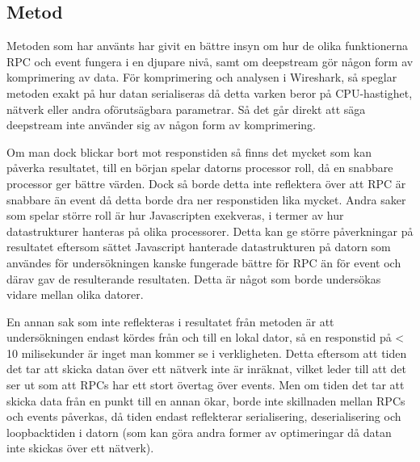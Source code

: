\subsection{Metod}
\label{subsec:tim-discussion-method}
Metoden som har använts har givit en bättre insyn om hur de olika funktionerna RPC och event fungera i en djupare nivå, samt om deepstream gör någon form av komprimering av data. För komprimering och analysen i Wireshark, så speglar metoden exakt på hur datan serialiseras då detta varken beror på CPU-hastighet, nätverk eller andra oförutsägbara parametrar. Så det går direkt att säga deepstream inte använder sig av någon form av komprimering.

Om man dock blickar bort mot responstiden så finns det mycket som kan påverka resultatet, till en början spelar datorns processor roll, då en snabbare processor ger bättre värden. Dock så borde detta inte reflektera över att RPC är snabbare än event då detta borde dra ner responstiden lika mycket. Andra saker som spelar större roll är hur Javascripten exekveras, i termer av hur datastrukturer hanteras på olika processorer. Detta kan ge större påverkningar på resultatet eftersom sättet Javascript hanterade datastrukturen på datorn som användes för undersökningen kanske fungerade bättre för RPC än för event och därav gav de resulterande resultaten. Detta är något som borde undersökas vidare mellan olika datorer. 

En annan sak som inte reflekteras i resultatet från metoden är att undersökningen endast kördes från och till en lokal dator, så en responstid på < 10 milisekunder är inget man kommer se i verkligheten. Detta eftersom att tiden det tar att skicka datan över ett nätverk inte är inräknat, vilket leder till att det ser ut som att RPCs har ett stort övertag över events. Men om tiden det tar att skicka data från en punkt till en annan ökar, borde inte skillnaden mellan RPCs och events påverkas, då tiden endast reflekterar serialisering, deserialisering och loopbacktiden i datorn (som kan göra andra former av optimeringar då datan inte skickas över ett nätverk).
